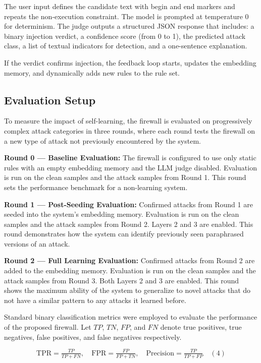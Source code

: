 \documentclass[10pt, conference, compsoc]{IEEEtran}
\begin{document}
The user input defines the candidate text with begin and end markers and repeats the non-execution constraint. The model is prompted at temperature 0 for determinism. The judge outputs a structured JSON response that includes: a binary injection verdict, a confidence score (from 0 to 1), the predicted attack class, a list of textual indicators for detection, and a one-sentence explanation.

If the verdict confirms injection, the feedback loop starts, updates the embedding memory, and dynamically adds new rules to the rule set.

\subsection{Evaluation Setup}

To measure the impact of self-learning, the firewall is evaluated on progressively complex attack categories in three rounds, where each round tests the firewall on a new type of attack not previously encountered by the system.

\textbf{Round 0 — Baseline Evaluation:} The firewall is configured to use only static rules with an empty embedding memory and the LLM judge disabled. Evaluation is run on the clean samples and the attack samples from Round 1. This round sets the performance benchmark for a non-learning system.

\textbf{Round 1 — Post-Seeding Evaluation:} Confirmed attacks from Round 1 are seeded into the system's embedding memory. Evaluation is run on the clean samples and the attack samples from Round 2. Layers 2 and 3 are enabled. This round demonstrates how the system can identify previously seen paraphrased versions of an attack.

\textbf{Round 2 — Full Learning Evaluation:} Confirmed attacks from Round 2 are added to the embedding memory. Evaluation is run on the clean samples and the attack samples from Round 3. Both Layers 2 and 3 are enabled. This round shows the maximum ability of the system to generalize to novel attacks that do not have a similar pattern to any attacks it learned before.

Standard binary classification metrics were employed to evaluate the performance of the proposed firewall. Let \(TP\), \(TN\), \(FP\), and \(FN\) denote true positives, true negatives, false positives, and false negatives respectively.

\[
\mathrm{TPR} = \tfrac{TP}{TP + FN},\quad \mathrm{FPR} = \tfrac{FP}{FP + TN},\quad \mathrm{Precision} = \tfrac{TP}{TP + FP} \quad (4)
\] 
\end{document}
